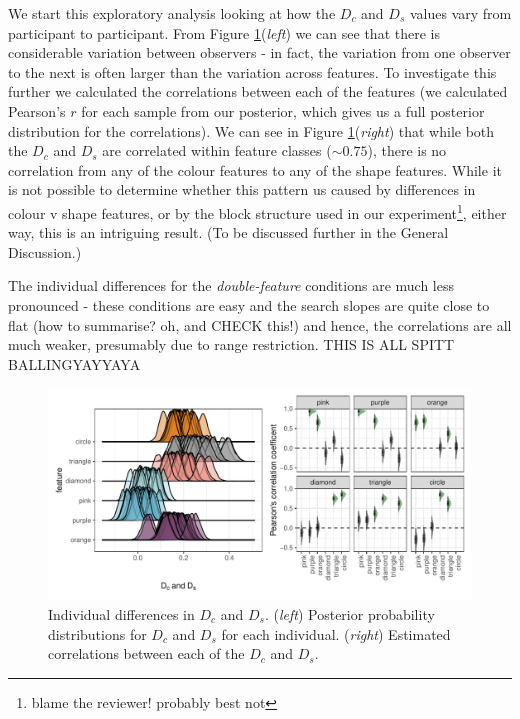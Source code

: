 \documentclass[preprint,12pt,authoryear]{elsarticle}
\begin{document}
We start this exploratory analysis looking at how the $D_c$ and $D_s$ values vary from participant to participant. From Figure \ref{fig:exp_corr}(\textit{left}) we can see that there is considerable variation between observers - in fact, the variation from one observer to the next is often larger than the variation across features. To investigate this further we calculated the correlations between each of the features (we calculated Pearson's $r$ for each sample from our posterior, which gives us a full posterior distribution for the correlations). We can see in Figure \ref{fig:exp_corr}(\textit{right}) that while both the $D_c$ and $D_s$ are correlated within feature classes ($\sim0.75$), there is no correlation from any of the colour features to any of the shape features. While it is not possible to determine whether this pattern us caused by differences in colour v shape features, or by the block structure used in our experiment\footnote{blame the reviewer! probably best not}, either way, this is an intriguing result. (To be discussed further in the General Discussion.)

The individual differences for the \textit{double-feature} conditions are much less pronounced - these conditions are easy and the search slopes are quite close to flat (how to summarise? oh, and CHECK this!) and hence, the correlations are all much weaker, presumably due to range restriction. THIS IS ALL SPITT BALLINGYAYYAYA

\begin{figure}[ht]
\centering
\includegraphics[width=\textwidth]{../plots/single_feature_correlations.pdf}
\caption{Individual differences in $D_c$ and $D_s$. (\textit{left}) Posterior probability distributions for $D_c$ and $D_s$ for each individual. (\textit{right}) Estimated correlations between each of the $D_c$ and $D_s$.}
\label{fig:exp_corr}
\end{figure}
\end{document}
